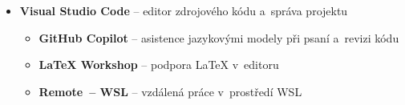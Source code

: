 \newcommand*{\swsubitems}[1]{%
  \begin{itemize}[%
    label={},%
    leftmargin=1.5em,%
    labelsep=0pt,%
    itemsep=0pt,%
    parsep=0pt,%
    topsep=2pt,%
    partopsep=0pt,%
    after=\vspace{0pt}]%
  #1%
  \end{itemize}}

\begin{itemize}[%
  label={},%
  leftmargin=0pt,%
  labelsep=0pt,%
  itemsep=0pt,%
  parsep=0pt,%
  topsep=0pt,%
  partopsep=0pt]

  \item \textbf{Visual Studio Code} -- editor zdrojového kódu a~správa projektu
  \swsubitems{%
    \item \textbf{GitHub Copilot} -- asistence jazykovými modely při psaní a~revizi kódu
    \item \textbf{LaTeX Workshop} -- podpora LaTeX v~editoru
    \item \textbf{Remote~-- WSL} -- vzdálená práce v~prostředí WSL
  }


\end{itemize}
